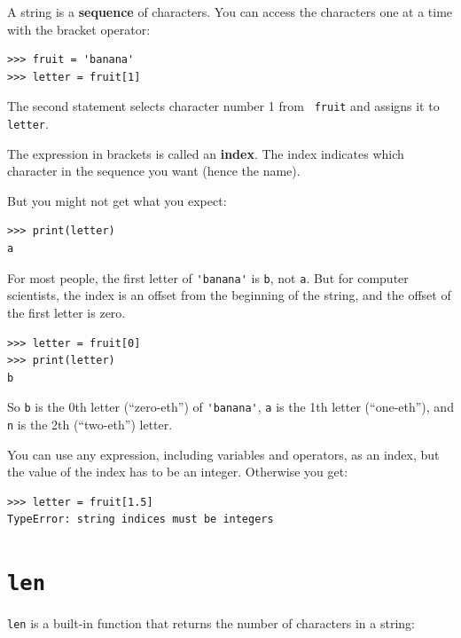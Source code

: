 \documentclass[10pt]{book}
\begin{document}
A string is a {\bf sequence} of characters.  
You can access the characters one at a time with the
bracket operator:

\beforeverb
\begin{verbatim}
>>> fruit = 'banana'
>>> letter = fruit[1]
\end{verbatim}
\afterverb
%
The second statement selects character number 1 from {\tt
fruit} and assigns it to {\tt letter}.  


The expression in brackets is called an {\bf index}.  
The index indicates which character in the sequence you
want (hence the name).

But you might not get what you expect:

\beforeverb
\begin{verbatim}
>>> print(letter)
a
\end{verbatim}
\afterverb
%
For most people, the first letter of \verb"'banana'" is {\tt b}, not
{\tt a}.  But for computer scientists, the index is an offset from the
beginning of the string, and the offset of the first letter is zero.

\beforeverb
\begin{verbatim}
>>> letter = fruit[0]
>>> print(letter)
b
\end{verbatim}
\afterverb
%
So {\tt b} is the 0th letter (``zero-eth'') of \verb"'banana'", {\tt a}
is the 1th letter (``one-eth''), and {\tt n} is the 2th (``two-eth'')
letter.


You can use any expression, including variables and operators, as an
index, but the value of the index has to be an integer.  Otherwise you
get:


\beforeverb
\begin{verbatim}
>>> letter = fruit[1.5]
TypeError: string indices must be integers
\end{verbatim}
\afterverb
%

\section{{\tt len}}


{\tt len} is a built-in function that returns the number of characters
in a string:
\end{document}
